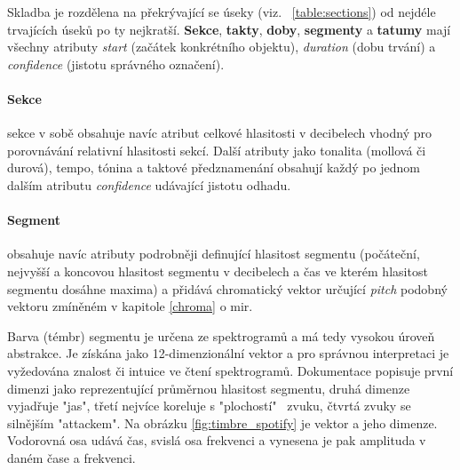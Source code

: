 \documentclass[thesis=B, czech]{FITthesis}[2019/03/06]
\begin{document}
\newpage




Skladba je rozdělena na překrývající se úseky (viz. \tablename~\ref{table:sections}) od nejdéle trvajících úseků po ty nejkratší. \textbf{Sekce}, \textbf{takty}, \textbf{doby}, \textbf{segmenty} a \textbf{tatumy} mají všechny atributy \textit{start} (začátek konkrétního objektu), \textit{duration} (dobu trvání) a \textit{confidence} (jistotu správného označení). 

\paragraph*{Sekce}

sekce v sobě obsahuje navíc atribut celkové hlasitosti v decibelech vhodný pro porovnávání relativní hlasitosti sekcí. Další atributy jako tonalita (mollová či durová), tempo, tónina a taktové předznamenání obsahují každý po jednom dalším atributu \textit{confidence} udávající jistotu odhadu.


\paragraph*{Segment}

obsahuje navíc atributy podrobněji definující hlasitost segmentu (počáteční, nejvyšší a koncovou hlasitost segmentu v decibelech a čas ve kterém hlasitost segmentu dosáhne maxima) a přidává chromatický vektor určující \textit{pitch} podobný vektoru zmíněném v kapitole \ref{chroma} o \gls{mir}.

Barva (témbr) segmentu je určena ze spektrogramů a má tedy vysokou úroveň abstrakce. Je získána jako 12-dimenzionální vektor a pro správnou interpretaci je vyžedována znalost či intuice ve čtení spektrogramů. Dokumentace popisuje první dimenzi jako reprezentující průměrnou hlasitost segmentu, druhá dimenze vyjadřuje "jas", třetí nejvíce koreluje s "plochostí" \ zvuku, čtvrtá zvuky se silnějším "attackem". Na obrázku \ref{fig:timbre_spotify} je vektor a jeho dimenze. Vodorovná osa udává čas, svislá osa frekvenci a vynesena je pak amplituda v daném čase a frekvenci.
\end{document}
